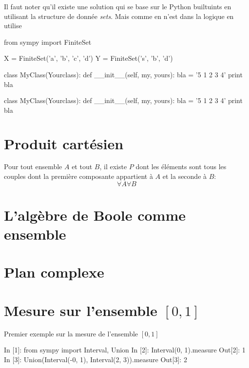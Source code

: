 \begin{solution}
Il faut noter qu'il existe une solution qui se base sur le Python builtuints en utilisant la structure de donnée \textit{sets}. Mais comme en n'est dans la logique en utilise 
\begin{python}
from sympy import FiniteSet

X = FiniteSet('a', 'b', 'c', 'd')
Y = FiniteSet('s', 'b', 'd')

class MyClass(Yourclass):
    def __init__(self, my, yours):
        bla = '5 1 2 3 4'
        print bla
\end{python}
\begin{python}
class MyClass(Yourclass):
    def __init__(self, my, yours):
        bla = '5 1 2 3 4'
        print bla
\end{python}

\end{solution}
\section{Produit cartésien}
 \begin{definition}
 Pour tout ensemble $A$ et tout $B$, il existe $P$ dont les éléments sont tous les couples dont la première composante appartient à $A$ et la seconde à $B$:
 \[
 \forall A \forall B
 \]
 
 \end{definition}
\section{L'algèbre de Boole comme ensemble}
 
 \begin{exercise}
 
 \end{exercise}
\section{Plan complexe}

\section{Mesure sur l'ensemble $\left[0,1\right] $ }
Premier exemple sur la mesure de l'ensemble  $\left[0,1\right]$
\begin{python}
In [1]: from sympy import Interval, Union
In [2]: Interval(0, 1).measure
Out[2]: 1
In [3]: Union(Interval(-0, 1), Interval(2, 3)).measure                          
Out[3]: 2
\end{python}